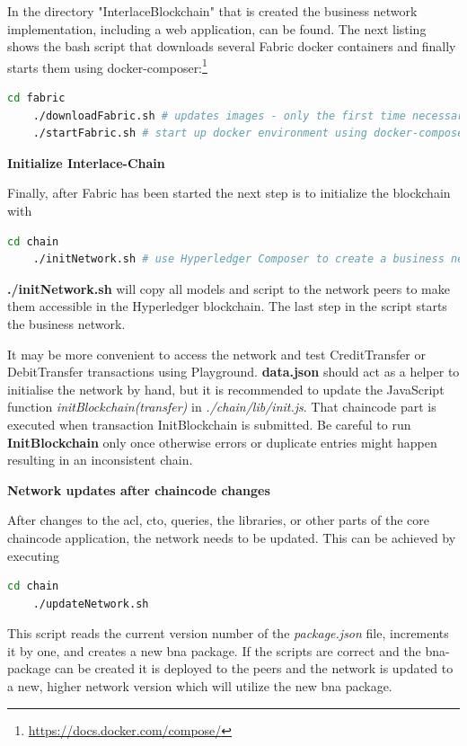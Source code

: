 In the directory "InterlaceBlockchain" that is created the business network implementation, including a web application, can be found. The next listing shows the bash script that downloads several Fabric docker containers and finally starts them using docker-composer:\footnote{\url{https://docs.docker.com/compose/}}

\begin{lstlisting}[language=bash]
	cd fabric
	./downloadFabric.sh # updates images - only the first time necessary
	./startFabric.sh # start up docker environment using docker-compose
\end{lstlisting}




\textbf{Initialize Interlace-Chain}

Finally, after Fabric has been started the next step is to initialize the blockchain with

\begin{lstlisting}[language=bash]
	cd chain
	./initNetwork.sh # use Hyperledger Composer to create a business network and deploy it
\end{lstlisting}

\textbf{./initNetwork.sh} will copy all models and script to the network peers to make them accessible in the Hyperledger blockchain. The last step in the script starts the business network.

It may be more convenient to access the network and test CreditTransfer or DebitTransfer transactions using Playground. \textbf{data.json} should act as a helper to initialise the network by hand, but it is recommended to update the JavaScript function \textit{initBlockchain(transfer)} in \textit{./chain/lib/init.js}. That chaincode part is executed when transaction InitBlockchain is submitted. Be careful to run \textbf{InitBlockchain} only once otherwise errors or duplicate entries might happen resulting in an inconsistent chain.

\textbf{Network updates after chaincode changes}

After changes to the acl, cto, queries, the libraries, or other parts of the core chaincode application, the network needs to be updated. This can be achieved by executing

\begin{lstlisting}[language=bash]
	cd chain
	./updateNetwork.sh
\end{lstlisting}

This script reads the current version number of the \textit{package.json} file, increments it by one, and creates a new bna package. If the scripts are correct and the bna-package can be created it is deployed to the peers and the network is updated to a new, higher network version which will utilize the new bna package.

